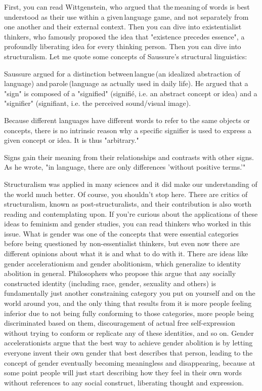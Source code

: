 \documentclass[12 pt, a4paper]{article}
\begin{document}
First, you can read Wittgenstein, who argued that the meaning of words is best understood as their use within a given language game, and not separately from one another and their external context. Then you can dive into existentialist thinkers, who famously proposed the idea that "existence precedes essence", a profoundly liberating idea for every thinking person. Then you can dive into structuralism. Let me quote some concepts of Saussure's structural linguistics: 

Saussure argued for a distinction between langue (an idealized abstraction of language) and parole (language as actually used in daily life). He argued that a "sign" is composed of a "signified" (signifié, i.e. an abstract concept or idea) and a "signifier" (signifiant, i.e. the perceived sound/visual image). 

Because different languages have different words to refer to the same objects or concepts, there is no intrinsic reason why a specific signifier is used to express a given concept or idea. It is thus "arbitrary." 

Signs gain their meaning from their relationships and contrasts with other signs. As he wrote, "in language, there are only differences 'without positive terms.'"

Structuralism was applied in many sciences and it did make our understanding of the world much better. Of course, you shouldn't stop here. There are critics of structuralism, known as post-structuralists, and their contribution is also worth reading and contemplating upon. If you're curious about the applications of these ideas to feminism and gender studies, you can read thinkers who worked in this issue. What is gender was one of the concepts that were essential categories before being questioned by non-essentialist thinkers, but even now there are different opinions about what it is and what to do with it. There are ideas like gender accelerationism and gender abolitionism, which generalize to identity abolition in general. Philosophers who propose this argue that any socially constructed identity (including race, gender, sexuality and others) is fundamentally just another constraining category you put on yourself and on the world around you, and the only thing that results from it is more people feeling inferior due to not being fully conforming to those categories, more people being discriminated based on them, discouragement of actual free self-expression without trying to conform or replicate any of these identities, and so on. Gender accelerationists argue that the best way to achieve gender abolition is by letting everyone invent their own gender that best describes that person, leading to the concept of gender eventually becoming meaningless and disappearing, because at some point people will just start describing how they feel in their own words without references to any social construct, liberating thought and expression. 
\end{document}
